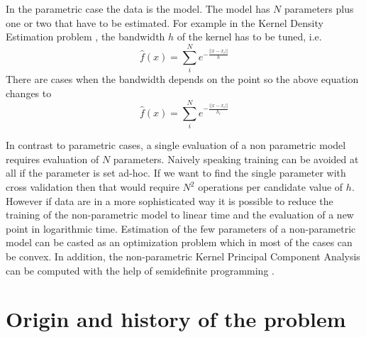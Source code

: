 \documentclass[12pt,letterpaper,doublespaced,ETD,dvips,proposal]{gtthesis}
\begin{document}
\begin{Body}
In the parametric case the data is the model. The model has $N$
parameters plus one or two that have to be estimated. For example in
the Kernel Density Estimation problem \cite{Silverman}, the bandwidth $h$ of the
kernel has to be tuned, i.e.
\begin{equation}
\hat{f}(x)=\sum_{i}^{N}e^{-\frac{||x-x_i||}{h}}
\end{equation}
There are cases when the bandwidth depends on the point so the above
equation changes to
\begin{equation}
\hat{f}(x)=\sum_{i}^{N}e^{-\frac{||x-x_i||}{h_i}}
\end{equation}


In contrast to parametric cases, a single evaluation of a non
parametric model requires evaluation of $N$ parameters. Naively
speaking training can be avoided at all if the parameter is set
ad-hoc. If we want to find the single parameter with cross
validation then that would require $N^2$ operations per candidate
value of $h$. However if data are in a more sophisticated way
it is possible to reduce the training of the non-parametric model to
linear time and the evaluation of a new point in logarithmic time.
Estimation of the few parameters of a non-parametric model can be
casted as an optimization problem which in most of the cases can be
convex. In addition, the non-parametric Kernel Principal Component
Analysis \cite{scholkopf1998nca} can be computed with the help
of semidefinite programming \cite{vandenberghe1996sp, boyd2004co}.

\section{Origin and history of the problem}
\label{origin}


\end{Body}
\end{document}
